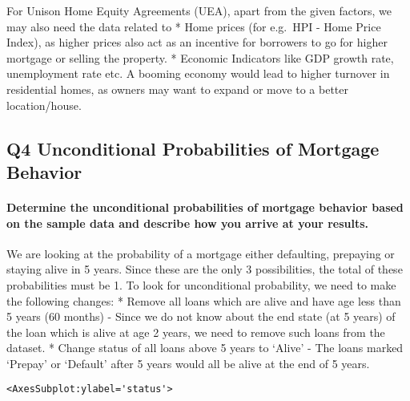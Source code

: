 \documentclass[11pt]{article}
\begin{document}
For Unison Home Equity Agreements (UEA), apart from the given factors,
we may also need the data related to * Home prices (for e.g.~HPI - Home
Price Index), as higher prices also act as an incentive for borrowers to
go for higher mortgage or selling the property. * Economic Indicators
like GDP growth rate, unemployment rate etc. A booming economy would
lead to higher turnover in residential homes, as owners may want to
expand or move to a better location/house.

    \hypertarget{q4-unconditional-probabilities-of-mortgage-behavior}{%
\subsection{Q4 Unconditional Probabilities of Mortgage
Behavior}\label{q4-unconditional-probabilities-of-mortgage-behavior}}

\hypertarget{determine-the-unconditional-probabilities-of-mortgage-behavior-based-on-the-sample-data-and-describe-how-you-arrive-at-your-results.}{%
\paragraph{Determine the unconditional probabilities of mortgage
behavior based on the sample data and describe how you arrive at your
results.}\label{determine-the-unconditional-probabilities-of-mortgage-behavior-based-on-the-sample-data-and-describe-how-you-arrive-at-your-results.}}

    We are looking at the probability of a mortgage either defaulting,
prepaying or staying alive in 5 years. Since these are the only 3
possibilities, the total of these probabilities must be 1. To look for
unconditional probability, we need to make the following changes: *
Remove all loans which are alive and have age less than 5 years (60
months) - Since we do not know about the end state (at 5 years) of the
loan which is alive at age 2 years, we need to remove such loans from
the dataset. * Change status of all loans above 5 years to `Alive' - The
loans marked `Prepay' or `Default' after 5 years would all be alive at
the end of 5 years.

            \begin{tcolorbox}[breakable, size=fbox, boxrule=.5pt, pad at break*=1mm, opacityfill=0]
\begin{Verbatim}[commandchars=\\\{\}]
<AxesSubplot:ylabel='status'>
\end{Verbatim}
\end{tcolorbox}
        
\end{document}
